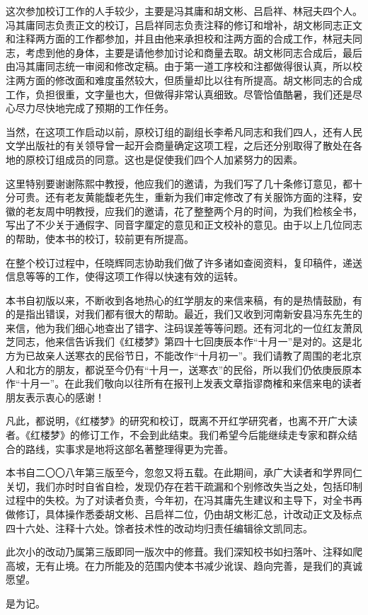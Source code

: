 \par 这次参加校订工作的人手较少，主要是冯其庸和胡文彬、吕启祥、林冠夫四个人。冯其庸同志负责正文的校订，吕启祥同志负责注释的修订和增补，胡文彬同志正文和注释两方面的工作都参加，并且由他来承担校和注两方面的合成工作，林冠夫同志，考虑到他的身体，主要是请他参加讨论和商量去取。胡文彬同志合成后，最后由冯其庸同志统一审阅和修改定稿。由于第一道工序校和注都做得很认真，所以校注两方面的修改面和难度虽然较大，但质量却比以往有所提高。胡文彬同志的合成工作，负担很重，文字量也大，但做得非常认真细致。尽管恰值酷暑，我们还是尽心尽力尽快地完成了预期的工作任务。
\par 当然，在这项工作启动以前，原校订组的副组长李希凡同志和我们四人，还有人民文学出版社的有关领导曾一起开会商量确定这项工程，之后还分别取得了散处在各地的原校订组成员的同意。这也是促使我们四个人加紧努力的因素。
\par 这里特别要谢谢陈熙中教授，他应我们的邀请，为我们写了几十条修订意见，都十分可贵。还有老友黄能馥老先生，重新为我们审定修改了有关服饰方面的注释，安徽的老友周中明教授，应我们的邀请，花了整整两个月的时间，为我们检核全书，写出了不少关于通假字、同音字厘定的意见和正文校补的意见。由于以上几位同志的帮助，使本书的校订，较前更有所提高。
\par 在整个校订过程中，任晓辉同志协助我们做了许多诸如查阅资料，复印稿件，递送信息等等的工作，使得这项工作得以快速有效的运转。
\par 本书自初版以来，不断收到各地热心的红学朋友的来信来稿，有的是热情鼓励，有的是指出错误，对我们都有很大的帮助。最近，我们又收到河南新安县冯东先生的来信，他为我们细心地查出了错字、注码误差等等问题。还有河北的一位红友萧凤芝同志，他来信告诉我们《红楼梦》第四十七回庚辰本作“十月一”是对的。这是北方为已故亲人送寒衣的民俗节日，不能改作“十月初一”。我们请教了周围的老北京人和北方的朋友，都说至今仍有“十月一，送寒衣”的民俗，所以我们仍依庚辰原本作“十月一”。在此我们敬向以往所有在报刊上发表文章指谬商榷和来信来电的读者朋友表示衷心的感谢！
\par 凡此，都说明，《红楼梦》的研究和校订，既离不开红学研究者，也离不开广大读者。《红楼梦》的修订工作，不会到此结束。我们希望今后能继续走专家和群众结合的路线，实事求是地将这部名著整理得更为完善。
\par {}
\par {}
\par 本书自二〇〇八年第三版至今，忽忽又将五载。在此期间，承广大读者和学界同仁关切，我们亦时时自省自检，发现仍存在若干疏漏和个别修改失当之处，包括印制过程中的失校。为了对读者负责，今年初，在冯其庸先生建议和主导下，对全书再做修订，具体操作悉委胡文彬、吕启祥二位，仍由胡文彬汇总，计改动正文及标点四十六处、注释十六处。馀者技术性的改动均归责任编辑徐文凯同志。
\par 此次小的改动乃属第三版即同一版次中的修葺。我们深知校书如扫落叶、注释如爬高坡，无有止境。在力所能及的范围内使本书减少讹误、趋向完善，是我们的真诚愿望。
\par 是为记。
\par {}
\par {}


